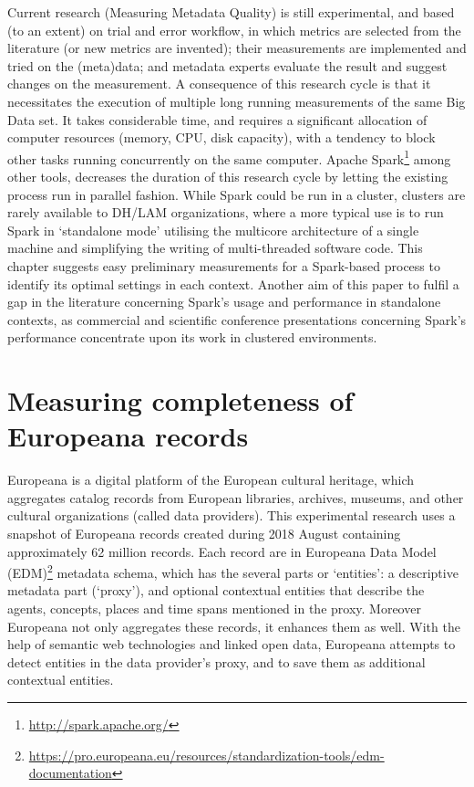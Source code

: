 Current research (Measuring Metadata Quality) is still experimental, and based (to an extent) on trial and error workflow, in which metrics are selected from the literature  (or new metrics are invented); their measurements are implemented and tried on the (meta)data; and metadata experts evaluate the result and suggest changes on the measurement. A consequence of this research cycle is that it necessitates the execution of multiple long running measurements of the same Big Data set. It takes considerable time, and requires a significant allocation of computer resources (memory, CPU, disk capacity), with a tendency to block other tasks running concurrently on the same computer. Apache Spark\footnote{\url{http://spark.apache.org/}} among other tools, decreases the duration of this research cycle by letting the existing process run in parallel fashion. While Spark could be run in a cluster, clusters are rarely available to DH/LAM organizations, where a more typical use is to run Spark in `standalone mode' utilising the multicore architecture of a single machine and simplifying the writing of multi-threaded software code. This chapter suggests easy preliminary measurements for a Spark-based process to identify its optimal settings in each context. Another aim of this paper to fulfil a gap in the literature concerning Spark’s usage and performance in standalone contexts, as commercial and scientific conference presentations concerning Spark’s performance concentrate upon its work in clustered environments.

\section{Measuring completeness of Europeana records}

Europeana is a digital platform of the European cultural heritage, which aggregates catalog records from European libraries, archives, museums, and other cultural organizations (called data providers). This experimental research uses a snapshot of Europeana records created during 2018 August containing approximately 62 million records. Each record are in Europeana Data Model (EDM)\footnote{\url{https://pro.europeana.eu/resources/standardization-tools/edm-documentation}} metadata schema, which has the several parts or `entities': a descriptive metadata part (`proxy'), and optional contextual entities that describe the agents, concepts, places and time spans mentioned in the proxy. Moreover Europeana not only aggregates these records, it enhances them as well. With the help of semantic web technologies and linked open data, Europeana attempts to detect entities in the data provider's proxy, and to save them as additional contextual entities.

